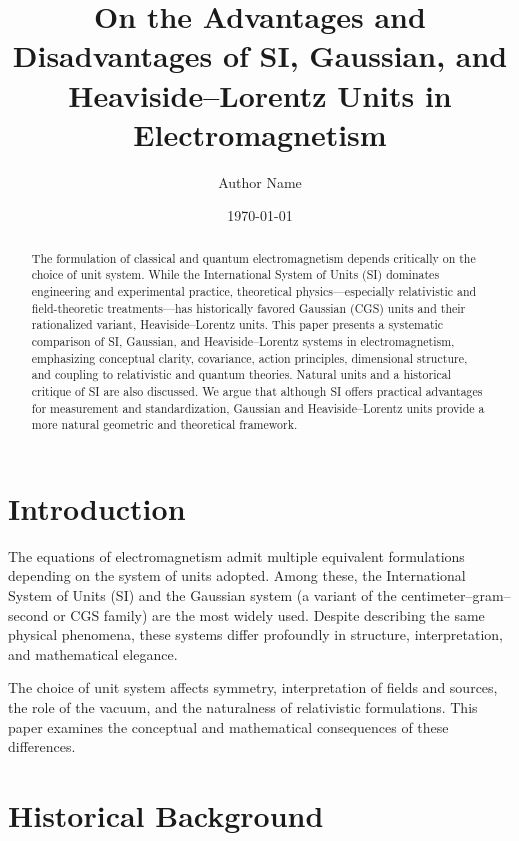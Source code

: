 \documentclass[aps,prd,preprint,superscriptaddress,nofootinbib]{revtex4-2}
\begin{document}
\title{On the Advantages and Disadvantages of SI, Gaussian, and Heaviside--Lorentz Units in Electromagnetism}

\author{Author Name}

\date{\today}

\begin{abstract}
The formulation of classical and quantum electromagnetism depends critically on the choice of unit system. While the International System of Units (SI) dominates engineering and experimental practice, theoretical physics—especially relativistic and field-theoretic treatments—has historically favored Gaussian (CGS) units and their rationalized variant, Heaviside--Lorentz units. This paper presents a systematic comparison of SI, Gaussian, and Heaviside--Lorentz systems in electromagnetism, emphasizing conceptual clarity, covariance, action principles, dimensional structure, and coupling to relativistic and quantum theories. Natural units and a historical critique of SI are also discussed. We argue that although SI offers practical advantages for measurement and standardization, Gaussian and Heaviside--Lorentz units provide a more natural geometric and theoretical framework.
\end{abstract}

\maketitle

\section{Introduction}

The equations of electromagnetism admit multiple equivalent formulations depending on the system of units adopted. Among these, the International System of Units (SI) and the Gaussian system (a variant of the centimeter–gram–second or CGS family) are the most widely used. Despite describing the same physical phenomena, these systems differ profoundly in structure, interpretation, and mathematical elegance.

The choice of unit system affects symmetry, interpretation of fields and sources, the role of the vacuum, and the naturalness of relativistic formulations. This paper examines the conceptual and mathematical consequences of these differences.

\section{Historical Background}
\end{document}
